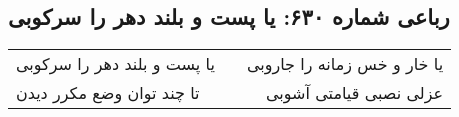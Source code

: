 \begin{center}
\section*{رباعی شماره ۶۳۰: یا پست و بلند دهر را سرکوبی}
\label{sec:sh630}
\begin{longtable}{l p{0.5cm} r}
یا پست و بلند دهر را سرکوبی
&&
یا خار و خس زمانه را جاروبی
\\
تا چند توان وضع مکرر دیدن
&&
عزلی نصبی قیامتی آشوبی
\\
\end{longtable}
\end{center}
